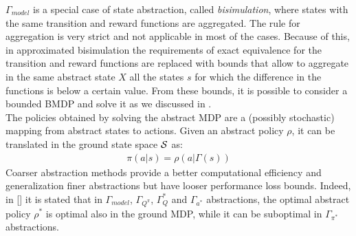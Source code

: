 \noindent $\Gamma_{model}$ is a special case of state abstraction, called \emph{bisimulation}, where states with the same transition and reward functions are aggregated. The rule for aggregation is very strict and not applicable in most of the cases. Because of this, in approximated bisimulation the requirements of exact equivalence for the transition and reward functions are replaced with bounds that allow to aggregate in the same abstract state $X$ all the states $s$ for which the difference in the functions is below a certain value. From these bounds, it is possible to consider a bounded \ac{BMDP} and solve it as we discussed in .\\
\newline
The policies obtained by solving the abstract \ac{MDP} are a (possibly stochastic) mapping from abstract states to actions. Given an abstract policy $\rho$, it can be translated in the ground state space $\mathcal{S}$ as: 
\begin{align}
	\pi(a|s) = \rho(a|\Gamma(s))
\end{align}
Coarser abstraction methods provide a better computational efficiency and generalization \wrt finer abstractions but have looser performance loss bounds. Indeed, in [\cite{lihong2006towards}] it is stated that in $\Gamma_{model}$, $\Gamma_{Q^{\pi}}$, $\Gamma_Q^{*}$ and $\Gamma_{a^{*}}$ abstractions, the optimal abstract policy $\rho^{*}$ is optimal also in the ground \ac{MDP}, while it can be suboptimal in $\Gamma_{\pi^{*}}$ abstractions.

